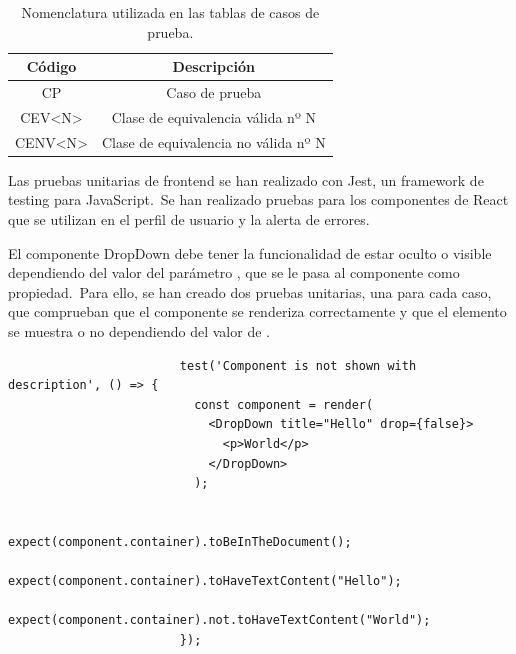 \begin{table}[H]
	\centering
	\caption{Nomenclatura utilizada en las tablas de casos de prueba.}
	\begin{tabular}{|c|c|}
		\hline
		\textbf{Código}           & \textbf{Descripción}                 \\ \hline
		CP                          & Caso de prueba                       \\ \hline
		CEV\textless N\textgreater  & Clase de equivalencia válida nº N    \\ \hline
		CENV\textless N\textgreater & Clase de equivalencia no válida nº N \\ \hline
	\end{tabular}
	\label{tab:nomenclatura-casos-prueba-caja-negra}
\end{table}


Las pruebas unitarias de frontend se han realizado con Jest, un framework de testing para JavaScript.\ Se han
realizado pruebas para los componentes de React que se utilizan en el perfil de usuario y la alerta de errores.

El componente DropDown debe tener la funcionalidad de estar oculto o visible dependiendo del valor del parámetro
, que se le pasa al componente como propiedad.\ Para ello, se han creado dos pruebas unitarias,
una para cada caso, que comprueban que el componente se renderiza correctamente y que el elemento  se
muestra o no dependiendo del valor de .

\begin{codeBlock}
	\begin{verbatim}
						test('Component is not shown with description', () => {
						  const component = render(
						    <DropDown title="Hello" drop={false}>
						      <p>World</p>
						    </DropDown>
						  );

						  expect(component.container).toBeInTheDocument();
						  expect(component.container).toHaveTextContent("Hello");
						  expect(component.container).not.toHaveTextContent("World");
						});
	\end{verbatim}
	\caption{Prueba unitaria para el componente DropDown cuando  es .}
	\label{code:prueba-unitaria-dropdown-false}
\end{codeBlock}

